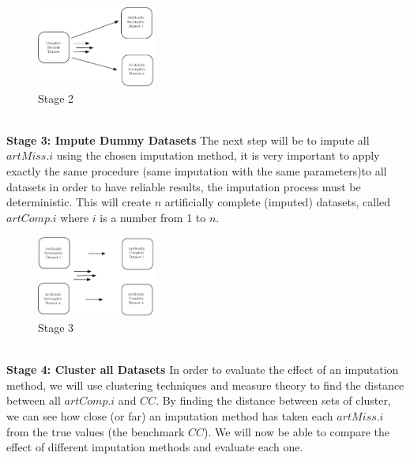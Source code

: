 \documentclass{IEEEconf}
\begin{document}
		\begin{figure}[!ht]
			\caption{Stage 2}
			\centering
			\includegraphics[width=0.35\textwidth]{stage22.pdf}
		\end{figure}
		\\
		\indent \textbf{Stage 3: Impute Dummy Datasets}
		The next step will be to impute all $artMiss.i$ using the chosen imputation method, it is very important to apply exactly the same procedure (same imputation with the same parameters)to all datasets in order to have reliable results, the imputation process must be deterministic. This will create $n$ artificially complete (imputed) datasets, called $artComp.i$ where $i$ is a number from 1 to $n$. 
		\begin{figure}[!ht]
			\caption{Stage 3}
			\centering
			\includegraphics[width=0.35\textwidth]{stage3-2.pdf}
		\end{figure}
		\\
		\indent \textbf{Stage 4: Cluster all Datasets}
		In order to evaluate the effect of an imputation method, we will use clustering techniques and measure theory to find the distance between all $artComp.i$ and $CC$. By finding the distance between sets of cluster, we can see how close (or far) an imputation method has taken each $artMiss.i$ from the true values (the benchmark $CC$). We will now be able to compare the effect of different imputation methods and evaluate each one.
\end{document}
